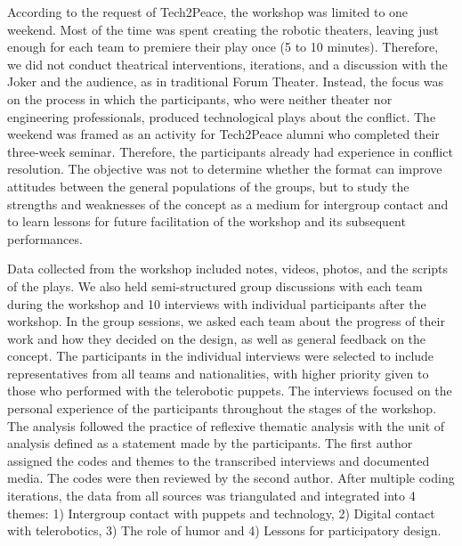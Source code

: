 \documentclass[dissertation,math,vertlayout,pdfa,colorlinks,nologo]{aaltoseries}
\begin{document}
According to the request of Tech2Peace, the workshop was limited to one weekend. Most of the time was spent creating the robotic theaters, leaving just enough for each team to premiere their play once (5 to 10 minutes). Therefore, we did not conduct theatrical interventions, iterations, and a discussion with the Joker and the audience, as in traditional Forum Theater. Instead, the focus was on the process in which the participants, who were neither theater nor engineering professionals, produced technological plays about the conflict. The weekend was framed as an activity for Tech2Peace alumni who completed their three-week seminar. Therefore, the participants already had experience in conflict resolution. The objective was not to determine whether the format can improve attitudes between the general populations of the groups, but to study the strengths and weaknesses of the concept as a medium for intergroup contact and to learn lessons for future facilitation of the workshop and its subsequent performances.

Data collected from the workshop included notes, videos, photos, and the scripts of the plays. We also held semi-structured group discussions with each team during the workshop and 10 interviews with individual participants after the workshop. In the group sessions, we asked each team about the progress of their work and how they decided on the design, as well as general feedback on the concept. The participants in the individual interviews were selected to include representatives from all teams and nationalities, with higher priority given to those who performed with the telerobotic puppets. The interviews focused on the personal experience of the participants throughout the stages of the workshop. The analysis followed the practice of reflexive thematic analysis \cite{braunUsingThematicAnalysis2006,braunReflectingReflexiveThematic2019} with the unit of analysis defined as a statement made by the participants. The first author assigned the codes and themes to the transcribed interviews and documented media. The codes were then reviewed by the second author. After multiple coding iterations, the data from all sources was triangulated \cite{guionTriangulationEstablishingValidity2011} and integrated into 4 themes: 1) Intergroup contact with puppets and technology, 2) Digital contact with telerobotics, 3) The role of humor and 4) Lessons for participatory design.
\end{document}
